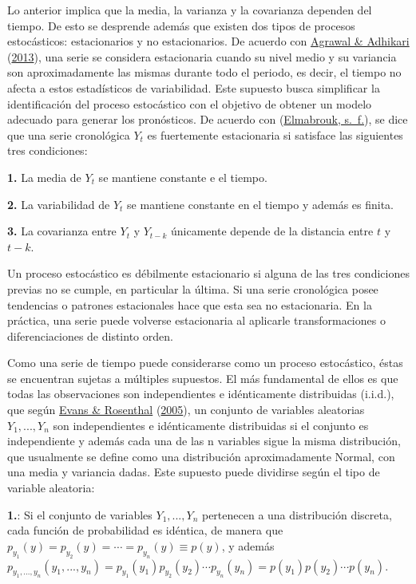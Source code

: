 \documentclass[
]{article}
\begin{document}
Lo anterior implica que la media, la varianza y la covarianza dependen
del tiempo. De esto se desprende además que existen dos tipos de
procesos estocásticos: estacionarios y no estacionarios. De acuerdo con
\protect\hyperlink{ref-stationary_def}{Agrawal \& Adhikari}
(\protect\hyperlink{ref-stationary_def}{2013}), una serie se considera
estacionaria cuando su nivel medio y su variancia son aproximadamente
las mismas durante todo el periodo, es decir, el tiempo no afecta a
estos estadísticos de variabilidad. Este supuesto busca simplificar la
identificación del proceso estocástico con el objetivo de obtener un
modelo adecuado para generar los pronósticos. De acuerdo con
(\protect\hyperlink{ref-definicion_estocastico}{Elmabrouk, s.~f.}), se
dice que una serie cronológica \(Y_t\) es fuertemente estacionaria si
satisface las siguientes tres condiciones:

\textbf{1.} La media de \(Y_t\) se mantiene constante e el tiempo.

\textbf{2.} La variabilidad de \(Y_t\) se mantiene constante en el
tiempo y además es finita.

\textbf{3.} La covarianza entre \(Y_t\) y \(Y_{t-k}\) únicamente depende
de la distancia entre \(t\) y \(t-k\).

Un proceso estocástico es débilmente estacionario si alguna de las tres
condiciones previas no se cumple, en particular la última. Si una serie
cronológica posee tendencias o patrones estacionales hace que esta sea
no estacionaria. En la práctica, una serie puede volverse estacionaria
al aplicarle transformaciones o diferenciaciones de distinto orden.

Como una serie de tiempo puede considerarse como un proceso estocástico,
éstas se encuentran sujetas a múltiples supuestos. El más fundamental de
ellos es que todas las observaciones son independientes e idénticamente
distribuidas (i.i.d.), que según
\protect\hyperlink{ref-definicion_iid}{Evans \& Rosenthal}
(\protect\hyperlink{ref-definicion_iid}{2005}), un conjunto de variables
aleatorias \(Y_1,...,Y_n\) son independientes e idénticamente
distribuidas si el conjunto es independiente y además cada una de las n
variables sigue la misma distribución, que usualmente se define como una
distribución aproximadamente Normal, con una media y variancia dadas.
Este supuesto puede dividirse según el tipo de variable aleatoria:

\textbf{1.}: Si el conjunto de variables \(Y_1,...,Y_n\) pertenecen a
una distribución discreta, cada función de probabilidad es idéntica, de
manera que \(p_{y_1}(y)=p_{y_2}(y)=\cdots=p_{y_n}(y)\equiv p(y)\), y
además
\(p_{y_1,...,y_n}(y_1,...,y_n)=p_{y_1}(y_1)p_{y_2}(y_2)\cdots p_{y_n}(y_n)=p(y_1)p(y_2)\cdots p(y_n)\).
\end{document}
